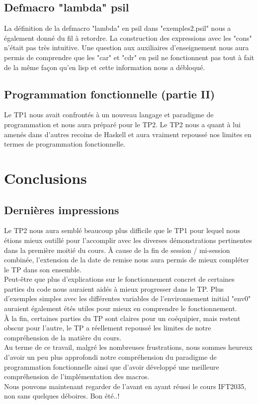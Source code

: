 \documentclass[11pt, letterpaper]{article}
\begin{document}
 \subsection{Defmacro "lambda" psil} 
 La définition de la defmacro "lambda" en psil dans "exemples2.psil" nous a également donné du fil à retordre. La construction des expressions avec les "cons" n'était pas très intuitive. Une question aux auxiliaires d'enseignement nous aura permis de comprendre que les "car" et "cdr" en psil ne fonctionnent pas tout à fait de la même façon qu'en lisp et cette information nous a débloqué.
 
 \subsection{Programmation fonctionnelle (partie II)}
 Le TP1 nous avait confrontés à un nouveau langage et paradigme de programmation et nous aura préparé pour le TP2. Le TP2 nous a quant à lui amenés dans d'autres recoins de Haskell et aura vraiment repoussé nos limites en termes de programmation fonctionnelle.
 
 \section{Conclusions}
 \subsection{Dernières impressions}
 Le TP2 nous aura semblé beaucoup plus difficile que le TP1 pour lequel nous étions mieux outillé pour l'accomplir avec les diverses démonstrations pertinentes dans la première moitié du cours. À cause de la fin de session / mi-session combinée, l'extension de la date de remise nous aura permis de mieux compléter le TP dans son ensemble.\\
 
 Peut-être que plus d'explications sur le fonctionnement concret de certaines parties du code nous auraient aidés à mieux progresser dans le TP. Plus d'exemples simples avec les différentes variables de l'environnement initial "env0" auraient également étés utiles pour mieux en comprendre le fonctionnement.\\
 
 À la fin, certaines parties du TP sont claires pour un coéquipier, mais restent obscur pour l'autre, le TP a réellement repoussé les limites de notre compréhension de la matière du cours.\\
 
 Au terme de ce travail, malgré les nombreuses frustrations, nous sommes heureux d'avoir un peu plus approfondi notre compréhension du paradigme de programmation fonctionnelle ainsi que d'avoir développé une meilleure compréhension de l'implémentation des macros.\\
 
 Nous pouvons maintenant regarder de l'avant en ayant réussi le cours IFT2035, non sans quelques déboires. Bon été..!
 
\end{document}
